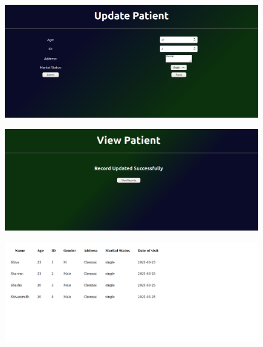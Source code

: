 \documentclass[12pt,letterpaper]{article}
\begin{document}
\subsubsection*{}
\begin{figure}[h]
    \centering
    \includegraphics[width = \textwidth]{Pics/update1.png}
\end{figure}
\begin{figure}[h!]
    \centering
    \includegraphics[width = \textwidth]{Pics/update2.png}
\end{figure}
\begin{figure}[h!]
    \centering
    \includegraphics[width = \textwidth]{Pics/update3.png}
\end{figure}
\newpage
\end{document}
